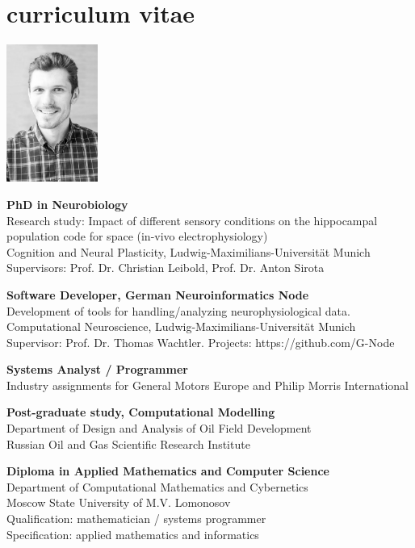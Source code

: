 \chapter{curriculum vitae}

\includegraphics[width=30mm]{assets/me.jpg}

\textbf{PhD in Neurobiology}\\
Research study: Impact of different sensory conditions on the hippocampal population code for space (in-vivo electrophysiology)\\
Cognition and Neural Plasticity, Ludwig-Maximilians-Universität Munich\\
Supervisors: Prof. Dr. Christian Leibold, Prof. Dr. Anton Sirota

\textbf{Software Developer, German Neuroinformatics Node}\\
Development of tools for handling/analyzing neurophysiological data.\\
Computational Neuroscience, Ludwig-Maximilians-Universität Munich\\
Supervisor: Prof. Dr. Thomas Wachtler. Projects: https://github.com/G-Node

\textbf{Systems Analyst / Programmer}\\
Industry assignments for General Motors Europe and Philip Morris International

\textbf{Post-graduate study, Computational Modelling}\\
Department of Design and Analysis of Oil Field Development\\
Russian Oil and Gas Scientific Research Institute

\textbf{Diploma in Applied Mathematics and Computer Science}\\
Department of Computational Mathematics and Cybernetics\\
Moscow State University of M.V. Lomonosov\\
Qualification: mathematician / systems programmer\\
Specification: applied mathematics and informatics



